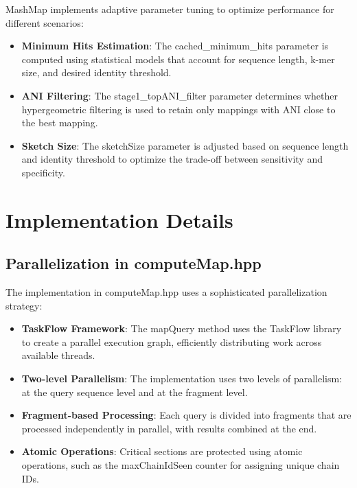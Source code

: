 \documentclass{article}
\begin{document}
MashMap implements adaptive parameter tuning to optimize performance for different scenarios:

\begin{itemize}
    \item \textbf{Minimum Hits Estimation}: The cached\_minimum\_hits parameter is computed using statistical models that account for sequence length, k-mer size, and desired identity threshold.
    
    \item \textbf{ANI Filtering}: The stage1\_topANI\_filter parameter determines whether hypergeometric filtering is used to retain only mappings with ANI close to the best mapping.
    
    \item \textbf{Sketch Size}: The sketchSize parameter is adjusted based on sequence length and identity threshold to optimize the trade-off between sensitivity and specificity.
\end{itemize}

\section{Implementation Details}

\subsection{Parallelization in computeMap.hpp}

The implementation in computeMap.hpp uses a sophisticated parallelization strategy:

\begin{itemize}
    \item \textbf{TaskFlow Framework}: The mapQuery method uses the TaskFlow library to create a parallel execution graph, efficiently distributing work across available threads.
    
    \item \textbf{Two-level Parallelism}: The implementation uses two levels of parallelism: at the query sequence level and at the fragment level.
    
    \item \textbf{Fragment-based Processing}: Each query is divided into fragments that are processed independently in parallel, with results combined at the end.
    
    \item \textbf{Atomic Operations}: Critical sections are protected using atomic operations, such as the maxChainIdSeen counter for assigning unique chain IDs.
\end{itemize}
\end{document}
